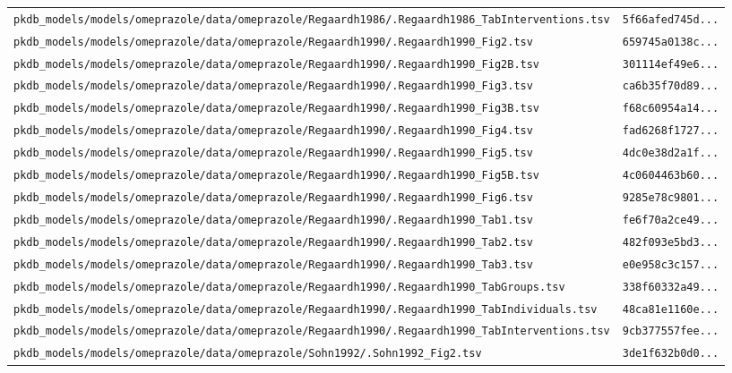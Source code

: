 \begin{longtable}{ll}
\texttt{pkdb\_models/models/omeprazole/data/omeprazole/Regaardh1986/.Regaardh1986\_TabInterventions.tsv} & \texttt{5f66afed745d...} \\
\texttt{pkdb\_models/models/omeprazole/data/omeprazole/Regaardh1990/.Regaardh1990\_Fig2.tsv} & \texttt{659745a0138c...} \\
\texttt{pkdb\_models/models/omeprazole/data/omeprazole/Regaardh1990/.Regaardh1990\_Fig2B.tsv} & \texttt{301114ef49e6...} \\
\texttt{pkdb\_models/models/omeprazole/data/omeprazole/Regaardh1990/.Regaardh1990\_Fig3.tsv} & \texttt{ca6b35f70d89...} \\
\texttt{pkdb\_models/models/omeprazole/data/omeprazole/Regaardh1990/.Regaardh1990\_Fig3B.tsv} & \texttt{f68c60954a14...} \\
\texttt{pkdb\_models/models/omeprazole/data/omeprazole/Regaardh1990/.Regaardh1990\_Fig4.tsv} & \texttt{fad6268f1727...} \\
\texttt{pkdb\_models/models/omeprazole/data/omeprazole/Regaardh1990/.Regaardh1990\_Fig5.tsv} & \texttt{4dc0e38d2a1f...} \\
\texttt{pkdb\_models/models/omeprazole/data/omeprazole/Regaardh1990/.Regaardh1990\_Fig5B.tsv} & \texttt{4c0604463b60...} \\
\texttt{pkdb\_models/models/omeprazole/data/omeprazole/Regaardh1990/.Regaardh1990\_Fig6.tsv} & \texttt{9285e78c9801...} \\
\texttt{pkdb\_models/models/omeprazole/data/omeprazole/Regaardh1990/.Regaardh1990\_Tab1.tsv} & \texttt{fe6f70a2ce49...} \\
\texttt{pkdb\_models/models/omeprazole/data/omeprazole/Regaardh1990/.Regaardh1990\_Tab2.tsv} & \texttt{482f093e5bd3...} \\
\texttt{pkdb\_models/models/omeprazole/data/omeprazole/Regaardh1990/.Regaardh1990\_Tab3.tsv} & \texttt{e0e958c3c157...} \\
\texttt{pkdb\_models/models/omeprazole/data/omeprazole/Regaardh1990/.Regaardh1990\_TabGroups.tsv} & \texttt{338f60332a49...} \\
\texttt{pkdb\_models/models/omeprazole/data/omeprazole/Regaardh1990/.Regaardh1990\_TabIndividuals.tsv} & \texttt{48ca81e1160e...} \\
\texttt{pkdb\_models/models/omeprazole/data/omeprazole/Regaardh1990/.Regaardh1990\_TabInterventions.tsv} & \texttt{9cb377557fee...} \\
\texttt{pkdb\_models/models/omeprazole/data/omeprazole/Sohn1992/.Sohn1992\_Fig2.tsv} & \texttt{3de1f632b0d0...} \\

\end{longtable}
